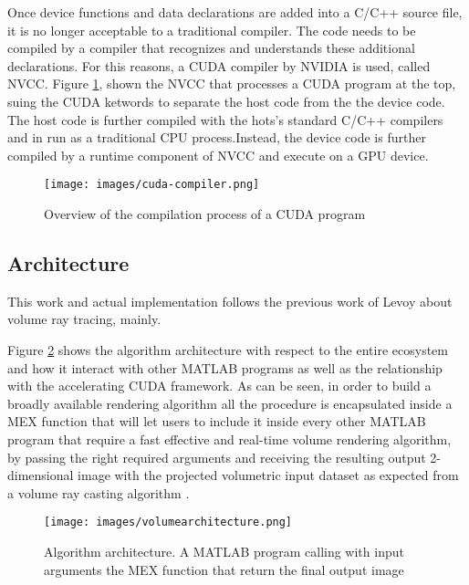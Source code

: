 \documentclass[12pt,a4paper]{extarticle}
\begin{document}
Once device functions and data declarations are added into a C/C++ source file, it is no longer acceptable to a traditional compiler. The code needs to be compiled by a compiler that recognizes and understands these additional declarations. For this reasons, a CUDA compiler by NVIDIA is used, called NVCC.
Figure \ref{fig:cudacompiler}, shown the NVCC that processes a CUDA program at the top, suing the CUDA ketwords to separate the host code from the the device code. The host code is further compiled with the hots's standard C/C++ compilers and in run as a traditional CPU process.Instead, the device code is further compiled by a runtime component of NVCC and execute on a GPU device.
\begin{figure}[hbtp]
\centering
\texttt{[image: images/cuda-compiler.png]}
\caption{Overview of the compilation process of a CUDA program}
\label{fig:cudacompiler}
\end{figure}



\subsection{Architecture} 
This work and actual implementation follows the previous work of Levoy about volume ray tracing, mainly.

Figure \ref{fig:architecture} shows the algorithm architecture with respect to the entire ecosystem and how it interact with other MATLAB programs as well as the relationship with the accelerating CUDA framework. As can be seen, in order to build a broadly available rendering algorithm all the procedure is encapsulated inside a MEX function that will let users to include it inside every other MATLAB program that require a fast effective and real-time volume rendering algorithm, by passing the right required arguments and receiving the resulting output 2-dimensional image with the projected volumetric input dataset as expected from a volume ray casting algorithm  \cite{levoy_1988:4}.

\begin{figure}[hbtp]
\centering
\texttt{[image: images/volumearchitecture.png]}
\caption{Algorithm architecture. A MATLAB program calling with input arguments the MEX function that return the final output image}
\label{fig:architecture}
\end{figure}
\end{document}
